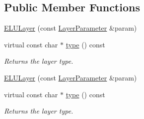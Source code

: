 \subsection*{Public Member Functions}
\begin{DoxyCompactItemize}
\item 
\mbox{\hyperlink{classcaffe_1_1_e_l_u_layer_af0b475c3d3b68f6daf7e2edcb7d5b97a}{E\+L\+U\+Layer}} (const \mbox{\hyperlink{classcaffe_1_1_layer_parameter}{Layer\+Parameter}} \&param)
\item 
\mbox{\label{classcaffe_1_1_e_l_u_layer_a438ef94c0d5040335f5b095f0f864f07}} 
virtual const char $\ast$ \mbox{\hyperlink{classcaffe_1_1_e_l_u_layer_a438ef94c0d5040335f5b095f0f864f07}{type}} () const
\begin{DoxyCompactList}\small\item\em Returns the layer type. \end{DoxyCompactList}\item 
\mbox{\hyperlink{classcaffe_1_1_e_l_u_layer_af0b475c3d3b68f6daf7e2edcb7d5b97a}{E\+L\+U\+Layer}} (const \mbox{\hyperlink{classcaffe_1_1_layer_parameter}{Layer\+Parameter}} \&param)
\item 
\mbox{\label{classcaffe_1_1_e_l_u_layer_a438ef94c0d5040335f5b095f0f864f07}} 
virtual const char $\ast$ \mbox{\hyperlink{classcaffe_1_1_e_l_u_layer_a438ef94c0d5040335f5b095f0f864f07}{type}} () const
\begin{DoxyCompactList}\small\item\em Returns the layer type. \end{DoxyCompactList}\end{DoxyCompactItemize}
